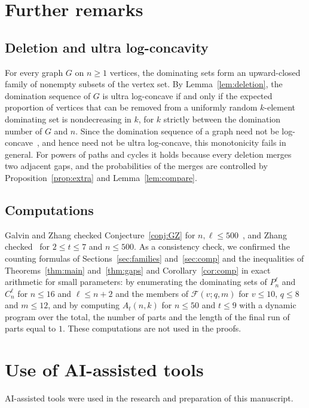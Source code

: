 \documentclass{amsart}
\theoremstyle{definition}
\theoremstyle{remark}
\numberwithin{equation}{section}
\newcommand{\cF}{\mathcal{F}}
\begin{document}
\section{Further remarks}\label{sec:remarks}

\subsection*{Deletion and ultra log-concavity}
For every graph $G$ on $n\ge1$ vertices, the dominating sets form an upward-closed family of nonempty subsets of the vertex set. By Lemma~\ref{lem:deletion}, the domination sequence of $G$ is ultra log-concave if and only if the expected proportion of vertices that can be removed from a uniformly random $k$-element dominating set is nondecreasing in $k$, for $k$ strictly between the domination number of $G$ and $n$. Since the domination sequence of a graph need not be log-concave~\cite{BB}, and hence need not be ultra log-concave, this monotonicity fails in general. For powers of paths and cycles it holds because every deletion merges two adjacent gaps, and the probabilities of the merges are controlled by Proposition~\ref{prop:extra} and Lemma~\ref{lem:compare}.

\subsection*{Computations}
Galvin and Zhang checked Conjecture~\ref{conj:GZ} for $n,\ell\le500$~\cite{GZ}, and Zhang checked~\cite[Conjecture~5.1.7]{Z} for $2\le t\le7$ and $n\le500$. As a consistency check, we confirmed the counting formulas of Sections~\ref{sec:families} and~\ref{sec:comp} and the inequalities of Theorems~\ref{thm:main} and~\ref{thm:gaps} and Corollary~\ref{cor:comp} in exact arithmetic for small parameters: by enumerating the dominating sets of $P_n^\ell$ and $C_n^\ell$ for $n\le16$ and $\ell\le n+2$ and the members of $\cF(v;q,m)$ for $v\le10$, $q\le8$ and $m\le12$, and by computing $A_t(n,k)$ for $n\le50$ and $t\le9$ with a dynamic program over the total, the number of parts and the length of the final run of parts equal to $1$. These computations are not used in the proofs.

\section*{Use of AI-assisted tools}
AI-assisted tools were used in the research and preparation of this manuscript.
\end{document}
